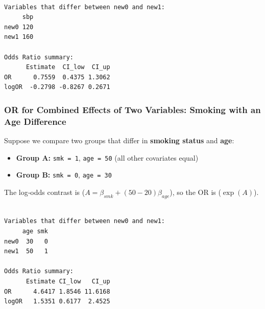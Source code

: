 \documentclass[
  letterpaper,
  DIV=11,
  numbers=noendperiod]{scrreprt}
\newenvironment{Shaded}{\begin{snugshade}}{\end{snugshade}}
\newcommand{\AttributeTok}[1]{\textcolor[rgb]{0.40,0.45,0.13}{#1}}
\newcommand{\DecValTok}[1]{\textcolor[rgb]{0.68,0.00,0.00}{#1}}
\newcommand{\FunctionTok}[1]{\textcolor[rgb]{0.28,0.35,0.67}{#1}}
\newcommand{\NormalTok}[1]{\textcolor[rgb]{0.00,0.23,0.31}{#1}}
\newcommand{\OtherTok}[1]{\textcolor[rgb]{0.00,0.23,0.31}{#1}}
\newcommand{\SpecialCharTok}[1]{\textcolor[rgb]{0.37,0.37,0.37}{#1}}
\providecommand{\tightlist}{%
  \setlength{\itemsep}{0pt}\setlength{\parskip}{0pt}}\usepackage{longtable,booktabs,array}
\begin{document}
\begin{verbatim}

Variables that differ between new0 and new1:
     sbp
new0 120
new1 160

Odds Ratio summary:
      Estimate  CI_low  CI_up
OR      0.7559  0.4375 1.3062
logOR  -0.2798 -0.8267 0.2671
\end{verbatim}

\subsubsection{OR for Combined Effects of Two Variables: Smoking with an
Age
Difference}\label{or-for-combined-effects-of-two-variables-smoking-with-an-age-difference}

Suppose we compare two groups that differ in \textbf{smoking status} and
\textbf{age}:

\begin{itemize}
\tightlist
\item
  \textbf{Group A:} \texttt{smk\ =\ 1}, \texttt{age\ =\ 50} (all other
  covariates equal)
\item
  \textbf{Group B:} \texttt{smk\ =\ 0}, \texttt{age\ =\ 30}
\end{itemize}

The log‑odds contrast is (\(A = \beta_{smk} + (50-20)\beta_{age}\)), so
the OR is (\(\exp(A)\)).

\begin{Shaded}
\end{Shaded}

\begin{verbatim}

Variables that differ between new0 and new1:
     age smk
new0  30   0
new1  50   1

Odds Ratio summary:
      Estimate CI_low   CI_up
OR      4.6417 1.8546 11.6168
logOR   1.5351 0.6177  2.4525
\end{verbatim}
\end{document}
